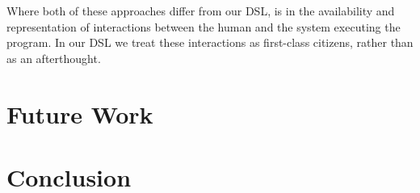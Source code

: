 \documentclass{sig-alternate-05-2015}
\begin{document}

Where both of these approaches differ from our DSL, is in the availability and
representation of interactions between the human and the system executing the
program. In our DSL we treat these interactions as first-class citizens,
rather than as an afterthought.

\section{Future Work}
\label{sec:future}



\section{Conclusion}
\label{sec:conclusion}





\end{document}
